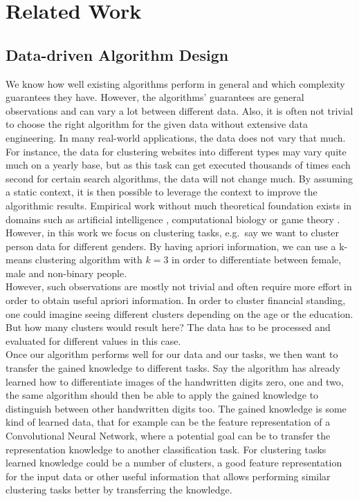 \chapter{Related Work}
\label{chapter:relatedwork}

\section{Data-driven Algorithm Design}

We know how well existing algorithms perform in general and which complexity guarantees they have. However, the algorithms' guarantees are general observations and can vary a lot between different data. Also, it is often not trivial to choose the right algorithm for the given data without extensive data engineering. In many real-world applications, the data does not vary that much. For instance, the data for clustering websites into different types may vary quite much on a yearly base, but as this task can get executed thousands of times each second for certain search algorithms, the data will not change much. By assuming a static context, it is then possible to leverage the context to improve the algorithmic results. Empirical work without much theoretical foundation exists in domains such as artificial intelligence \cite{Xu:2008:SPA:1622673.1622687}, computational biology \cite{deblasio2018adaptive} or game theory \cite{likhodedov2004methods}. However, in this work we focus on clustering tasks, e.g.\ say we want to cluster person data for different genders. By having apriori information, we can use a k-means clustering algorithm with $k = 3$ in order to differentiate between female, male and non-binary people.\\

However, such observations are mostly not trivial and often require more effort in order to obtain useful apriori information. In order to cluster financial standing, one could imagine seeing different clusters depending on the age or the education. But how many clusters would result here? The data has to be processed and evaluated for different values in this case.\\

Once our algorithm performs well for our data and our tasks, we then want to transfer the gained knowledge to different tasks. Say the algorithm has already learned how to differentiate images of the handwritten digits zero, one and two, the same algorithm should then be able to apply the gained knowledge to distinguish between other handwritten digits too. The gained knowledge is some kind of learned data, that for example can be the feature representation of a Convolutional Neural Network, where a potential goal can be to transfer the representation knowledge to another classification task. For clustering tasks learned knowledge could be a number of clusters, a good feature representation for the input data or other useful information that allows performing similar clustering tasks better by transferring the knowledge.\\

